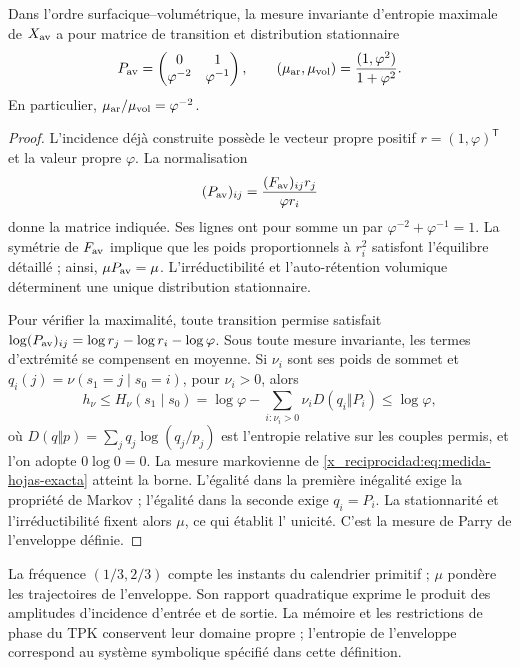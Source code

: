 \begin{proposition}
Dans l'ordre surfacique--volumétrique, la mesure invariante d'entropie maximale
de \(X_{\rm av}\) a pour matrice de transition et distribution stationnaire
\begin{equation}
 P_{\rm av}=\begin{pmatrix}0&1\\\varphi^{-2}&\varphi^{-1}\end{pmatrix},
 \qquad
 (\mu_{\rm ar},\mu_{\rm vol})
 =\frac{(1,\varphi^2)}{1+\varphi^2}.
 \label{x_reciprocidad:eq:medida-hojas-exacta}
\end{equation}
En particulier, \(\mu_{\rm ar}/\mu_{\rm vol}=\varphi^{-2}\).
\end{proposition}
\begin{proof}
L'incidence déjà construite possède le vecteur propre positif \(r=(1,\varphi)^{\mathsf T}\) et la valeur propre \(\varphi\). La normalisation
\[
 (P_{\rm av})_{ij}
 =\frac{(F_{\rm av})_{ij}r_j}{\varphi r_i}
\]
donne la matrice indiquée. Ses lignes ont pour somme un par \(\varphi^{-2}+\varphi^{-1}=1\). La symétrie de \(F_{\rm av}\) implique que les poids proportionnels à \(r_i^2\) satisfont l'équilibre détaillé ; ainsi, \(\mu P_{\rm av}=\mu\). L'irréductibilité et l'auto-rétention volumique déterminent une unique distribution stationnaire.

Pour vérifier la maximalité, toute transition permise satisfait
\(\log(P_{\rm av})_{ij}=\log r_j-\log r_i-\log\varphi\).
Sous toute mesure invariante, les termes d'extrémité se compensent
en moyenne. Si \(\nu_i\) sont ses poids de sommet et
\(q_i(j)=\nu(s_1=j\mid s_0=i)\), pour \(\nu_i>0\), alors
\[
 h_\nu\leq H_\nu(s_1\mid s_0)
 =\log\varphi-\sum_{i:\nu_i>0}\nu_iD(q_i\Vert P_i)
 \leq\log\varphi,
\]
où \(D(q\Vert p)=\sum_jq_j\log(q_j/p_j)\) est l'entropie
relative sur les couples permis, et l'on adopte \(0\log0=0\).
La mesure markovienne de \eqref{x_reciprocidad:eq:medida-hojas-exacta} atteint la borne.
L'égalité dans la première inégalité exige la propriété de Markov ;
l'égalité dans la seconde exige \(q_i=P_i\). La stationnarité et
l'irréductibilité fixent alors \(\mu\), ce qui établit l'
unicité. C'est la mesure de Parry de l'enveloppe définie.
\end{proof}

La fréquence \((1/3,2/3)\) compte les instants du calendrier primitif ;
\(\mu\) pondère les trajectoires de l'enveloppe. Son rapport quadratique
exprime le produit des amplitudes d'incidence d'entrée et de sortie.
La mémoire et les restrictions de phase du TPK conservent leur domaine
propre ; l'entropie de l'enveloppe correspond au système symbolique
spécifié dans cette définition.


